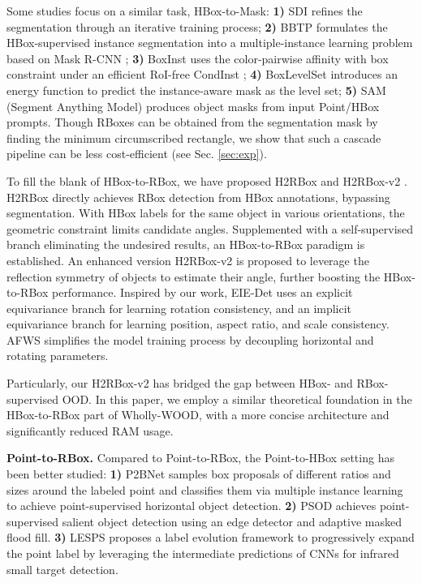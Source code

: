 Some studies focus on a similar task, HBox-to-Mask: \textbf{1)} SDI \cite{khoreva2017simple} refines the segmentation through an iterative training process; \textbf{2)} BBTP \cite{hsu2019weakly} formulates the HBox-supervised instance segmentation into a multiple-instance learning problem based on Mask R-CNN \cite{he2017mask}; \textbf{3)} BoxInst \cite{tian2021boxinst} uses the color-pairwise affinity with box constraint under an efficient RoI-free CondInst \cite{tian2020conditional}; \textbf{4)} BoxLevelSet \cite{li2022box} introduces an energy function to predict the instance-aware mask as the level set; \textbf{5)} SAM (Segment Anything Model) \cite{kirillov2023segany} produces object masks from input Point/HBox prompts. Though RBoxes can be obtained from the segmentation mask by finding the minimum circumscribed rectangle, we show that such a cascade pipeline can be less cost-efficient (see Sec. \ref{sec:exp}). 

To fill the blank of HBox-to-RBox, we have proposed H2RBox \cite{yang2023h2rbox} and H2RBox-v2 \cite{yu2023h2rboxv2}. H2RBox directly achieves RBox detection from HBox annotations, bypassing segmentation. With HBox labels for the same object in various orientations, the geometric constraint limits candidate angles. Supplemented with a self-supervised branch eliminating the undesired results, an HBox-to-RBox paradigm is established. An enhanced version H2RBox-v2 \cite{yu2023h2rboxv2} is proposed to leverage the reflection symmetry of objects to estimate their angle, further boosting the HBox-to-RBox performance. Inspired by our work, EIE-Det \cite{wang2024explicit} uses an explicit equivariance branch for learning rotation consistency, and an implicit equivariance branch for learning position, aspect ratio, and scale consistency. AFWS \cite{lu2024afws} simplifies the model training process by decoupling horizontal and rotating parameters.

Particularly, our H2RBox-v2 \cite{yu2023h2rboxv2} has bridged the gap between HBox- and RBox-supervised OOD. In this paper, we employ a similar theoretical foundation in the HBox-to-RBox part of Wholly-WOOD, with a more concise architecture and significantly reduced RAM usage.

\textbf{Point-to-RBox.} Compared to Point-to-RBox, the Point-to-HBox setting has been better studied: \textbf{1)} P2BNet \cite{chen2022pointtobox} samples box proposals of different ratios and sizes around the labeled point and classifies them via multiple instance learning to achieve point-supervised horizontal object detection. \textbf{2)} PSOD \cite{gao2022weakly} achieves point-supervised salient object detection using an edge detector and adaptive masked flood fill. \textbf{3)} LESPS \cite{ying2023mapping} proposes a label evolution framework to progressively expand the point label by leveraging the intermediate predictions of CNNs for infrared small target detection.

